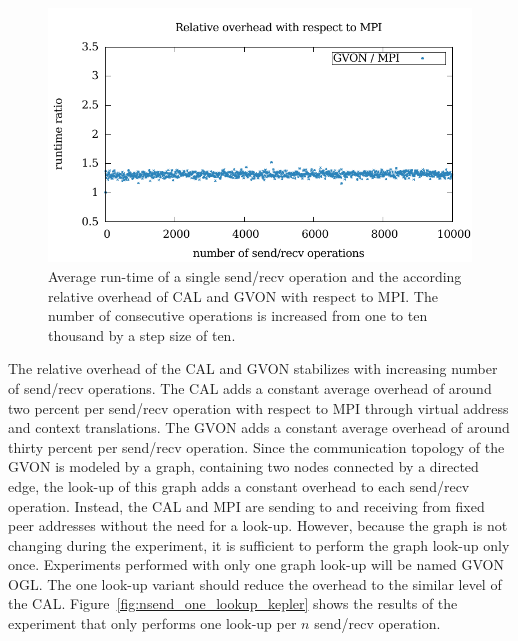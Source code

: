 \begin{figure}[H]
\begin{minipage}[t]{0.5\textwidth}
    \includegraphics[width=\textwidth]{plots/50_nsend_overhead_gvon}
  \end{minipage}%
  \caption{Average run-time of a single send/recv operation and the
    according relative overhead of CAL and GVON with respect to
    MPI. The number of consecutive operations is increased from one to
    ten thousand by a step size of ten. }
  \label{fig:nsend_kepler}
\end{figure}

\noindent The relative overhead of the CAL and GVON stabilizes with
increasing number of send/recv operations.  The CAL adds a constant
average overhead of around two percent per send/recv operation with
respect to MPI through virtual address and context translations. The
GVON adds a constant average overhead of around thirty percent per
send/recv operation.  Since the communication topology of the GVON is
modeled by a graph, containing two nodes connected by a directed edge,
the look-up of this graph adds a constant overhead to each
send/recv operation.  Instead, the CAL and MPI are sending to and
receiving from fixed peer addresses without the need for a look-up.
However, because the graph is not changing during the experiment, it
is sufficient to perform the graph look-up only once. Experiments
performed with only one graph look-up will be named GVON OGL. The one
look-up variant should reduce the overhead to the similar level of
the CAL. Figure~\ref{fig:nsend_one_lookup_kepler} shows the results of
the experiment that only performs one look-up per $n$ send/recv
operation.

